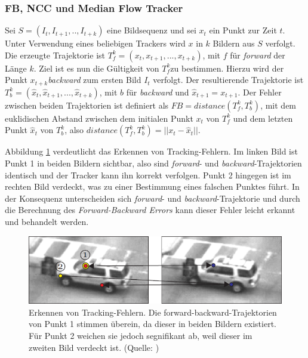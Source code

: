 	\subsubsection{FB, NCC und Median Flow Tracker}
	Sei $S=(I_{t},I_{t+1},..,I_{t+k})$ eine Bildsequenz und sei $x_{t}$ ein Punkt zur Zeit $t$. Unter Verwendung eines beliebigen Trackers wird $x$ in $k$ Bildern aus $S$ verfolgt. Die erzeugte Trajektorie ist $T_{f}^{k}=(x_{t},x_{t+1},...,x_{t+k})$, mit $f$ für \textit{forward} der Länge $k$. Ziel ist es nun die Gültigkeit von $T_{f}^{k}$zu bestimmen. Hierzu wird der Punkt $x_{t+k}$\textit{backward} zum ersten Bild $I_{t}$ verfolgt. Der resultierende Trajektorie ist $T_{b}^{k}=(\hat{x}_{t},\hat{x}_{t+1},...,\hat{x}_{t+k})$, mit $b$ für \textit{backward} und $\hat{x}_{t+1}=x_{t+1}$. Der Fehler zwischen beiden Trajektorien ist definiert als $FB=distance(T_{f}^{k},T_{b}^{k})$, mit dem euklidischen Abstand zwischen dem initialen Punkt $x_{t}$ von $T_{f}^{k}$ und dem letzten Punkt $\hat{x}_{t}$ von $T_{b}^{k}$, also $distance(T_{f}^{k},T_{b}^{k})=||x_{t}-\hat{x}_{t}||$.

	Abbildung \ref{fig:Prinzip-des-Media} verdeutlicht das Erkennen von Tracking-Fehlern. Im linken Bild ist Punkt 1 in beiden Bildern sichtbar, also sind \textit{forward}- und \textit{backward}-Trajektorien identisch und der Tracker kann ihn korrekt verfolgen. Punkt 2 hingegen ist im rechten Bild verdeckt, was zu einer Bestimmung eines falschen Punktes führt. In der Konsequenz unterscheiden sich \textit{forward}- und \textit{backward}-Trajektorie und durch die Berechnung des \textit{Forward-Backward Errors} kann dieser Fehler leicht erkannt und behandelt werden.

	\begin{figure}
	\begin{centering}
	\includegraphics[scale=0.7]{../pictures/MediaFlow.png}
	\par\end{centering}

	\caption[Erkennen von Tracking-Fehlern]{Erkennen von Tracking-Fehlern. Die forward-backward-Trajektorien von Punkt 1 stimmen überein, da dieser in beiden Bildern existiert. Für Punkt 2 weichen sie jedoch segnifikant ab, weil dieser im zweiten Bild verdeckt ist. (Quelle: \cite{MFT})\label{fig:Prinzip-des-Media}}
	\end{figure}

